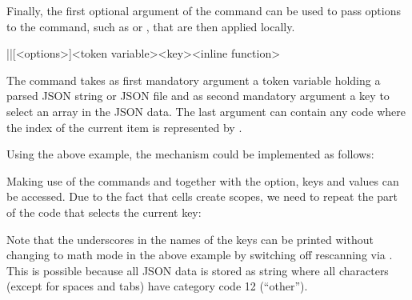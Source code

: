 \documentclass[a4paper]{article}
\begin{document}
{{Finally, the first optional argument of the command can be used to pass options to the command, such as  or , that are then applied locally.

\begin{macrodef}
|\JSONParseArrayMapInline|[<options>]{<token variable>}{<key>}{<inline function>}
\end{macrodef}
The command \macro{\JSONParseArrayMapInline} takes as first mandatory argument a token variable holding a parsed JSON string or JSON file and as second mandatory argument a key to select an array in the JSON data. The last argument can contain any code where the index of the current item is represented by .

Using the above example, the mechanism could be implemented as follows:

\begin{codeexamplecolumns}
\end{codeexamplecolumns}

Making use of the commands \macro{\JSONParseKeys} and \macro{\JSONParseValue} together with the  option, keys and values can be accessed. Due to the fact that cells create scopes, we need to repeat the part of the code that selects the current key:


Note that the underscores in the names of the keys can be printed without changing to math mode in the above example by switching off rescanning via . This is possible because all JSON data is stored as string where all characters (except for spaces and tabs) have category code 12 (``other'').

}}
\end{document}
